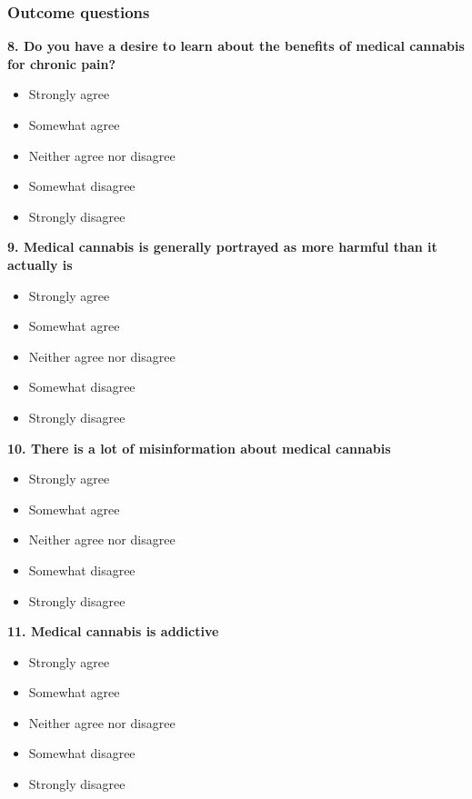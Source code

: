 \documentclass[
]{article}
\providecommand{\tightlist}{%
  \setlength{\itemsep}{0pt}\setlength{\parskip}{0pt}}
\begin{document}
\hypertarget{outcome-questions}{%
\subsubsection{Outcome questions}\label{outcome-questions}}

\textbf{8. Do you have a desire to learn about the benefits of medical
cannabis for chronic pain?}

\begin{itemize}
\tightlist
\item
  Strongly agree
\item
  Somewhat agree
\item
  Neither agree nor disagree
\item
  Somewhat disagree
\item
  Strongly disagree
\end{itemize}

\textbf{9. Medical cannabis is generally portrayed as more harmful than
it actually is}

\begin{itemize}
\tightlist
\item
  Strongly agree
\item
  Somewhat agree
\item
  Neither agree nor disagree
\item
  Somewhat disagree
\item
  Strongly disagree
\end{itemize}

\textbf{10. There is a lot of misinformation about medical cannabis}

\begin{itemize}
\tightlist
\item
  Strongly agree
\item
  Somewhat agree
\item
  Neither agree nor disagree
\item
  Somewhat disagree
\item
  Strongly disagree
\end{itemize}

\textbf{11. Medical cannabis is addictive}

\begin{itemize}
\tightlist
\item
  Strongly agree
\item
  Somewhat agree
\item
  Neither agree nor disagree
\item
  Somewhat disagree
\item
  Strongly disagree
\end{itemize}
\end{document}
